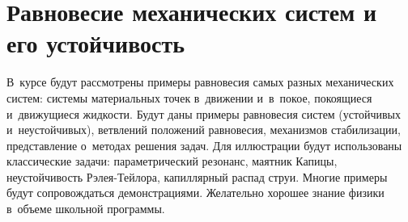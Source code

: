 
\section*{Равновесие механических систем и его устойчивость}



В~курсе будут рассмотрены примеры равновесия самых разных механических систем:
системы материальных точек в~движении и~в~покое, покоящиеся и~движущиеся
жидкости.
Будут даны примеры равновесия систем (устойчивых и~неустойчивых), ветвлений
положений равновесия, механизмов стабилизации, представление о~методах решения
задач.
Для иллюстрации будут использованы классические задачи: параметрический
резонанс, маятник Капицы, неустойчивость Рэлея-Тейлора, капиллярный распад
струи.
Многие примеры будут сопровождаться демонстрациями.
Желательно хорошее знание физики в~объеме школьной программы.

